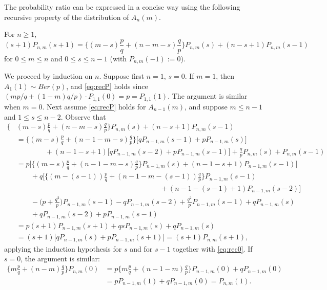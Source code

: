 \documentclass[11pt]{article}
\begin{document}
The probability ratio can be expressed in a concise way using the following 
recursive property of the distribution of $A_n(m)$.

\begin{lem}
For $n \geq 1$,
\begin{equation} \label{eq:recP}
(s+1) P_{n,m}(s+1) = \bigg\{ (m-s)\frac{p}{q} + (n-m-s)\frac{q}{p} \bigg\} P_{n,m}(s) + (n-s+1) P_{n,m}(s-1)
\end{equation}
for $0 \leq m \leq n$ and $0 \leq s \leq n-1$ (with $P_{n,m}(-1) := 0$).
\end{lem}
\begin{pf}
We proceed by induction on $n$.
Suppose first $n=1$, $s = 0$.
If $m=1$, then $A_1(1) \sim Ber(p)$, and \eqref{eq:recP} holds since 
$(mp/q + (1-m)q/p) \cdot P_{1,1}(0) = p = P_{1,1}(1)$.
The argument is similar when $m=0$.
Next assume \eqref{eq:recP} holds for $A_{n-1}(m)$, and suppose $m \leq n-1$ and $1 \leq s \leq n-2$.
Observe that
\begin{align*}
\bigg\{ &(m-s)\frac{p}{q} + (n-m-s)\frac{q}{p} \bigg\} P_{n,m}(s) + (n-s+1) P_{n,m}(s-1) \\
&= \bigg\{ (m-s)\frac{p}{q} + (n-1-m-s)\frac{q}{p} \bigg\} \big[qP_{n-1,m}(s-1) + pP_{n-1,m}(s)\big] \\
 &\qquad\qquad + (n-1-s+1) \big[qP_{n-1,m}(s-2) + pP_{n-1,m}(s-1)\big] +
 \frac{q}{p}P_{n,m}(s) + P_{n,m}(s-1) \\
 &= p\bigg[ \bigg\{ (m-s)\frac{p}{q} + (n-1-m-s)\frac{q}{p} \bigg\} P_{n-1,m}(s) + (n-1-s+1)P_{n-1,m}(s-1) \bigg] \\
 &\qquad + q\bigg[ \bigg\{ (m-(s-1))\frac{p}{q} + (n-1-m-(s-1))\frac{q}{p} \bigg\} P_{n-1,m}(s-1) \\
 &\hspace{20em} + (n-1-(s-1)+1)P_{n-1,m}(s-2) \bigg] \\
 &\qquad - \bigg(p + \frac{q^2}{p}\bigg) P_{n-1,m}(s-1) - qP_{n-1,m}(s-2) + \frac{q^2}{p}P_{n-1,m}(s-1) + qP_{n-1,m}(s) \\
 &\qquad + qP_{n-1,m}(s-2) + pP_{n-1,m}(s-1) \\
 &= p(s+1)P_{n-1,m}(s+1) + qsP_{n-1,m}(s) + qP_{n-1,m}(s) \\
 & = (s+1) \big[ qP_{n-1,m}(s) + pP_{n-1,m}(s+1) \big] = (s+1)P_{n,m}(s+1),
\end{align*}
applying the induction hypothesis for $s$ and for $s-1$ together with \eqref{eq:rec0}. If $s=0$, the argument is similar:
\begin{align*}
\bigg\{ m\frac{p}{q} + (n-m)\frac{q}{p} \bigg\} P_{n,m}(0)
&= p\bigg\{ m\frac{p}{q} + (n-1-m)\frac{q}{p} \bigg\} P_{n-1,m}(0) + qP_{n-1,m}(0) \\
 &= pP_{n-1,m}(1) + qP_{n-1,m}(0) = P_{n,m}(1).
\end{align*}
\end{pf}
\end{document}
